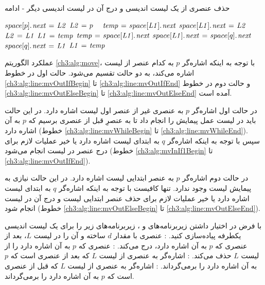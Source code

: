 \begin{algorithm}
\caption*{حذف عنصری از یک لیست اندیسی و درج آن در لیست اندیسی دیگر - ادامه}
\begin{latin}
\begin{algorithmic}[1]
						\State	$space[p].\hspace*{1pt}\mathit{next} \mathrel{\hspace{1pt}=\hspace{1pt}} \mathit{L2}$
						\State	$\mathit{L2} \mathrel{\hspace{1pt}=\hspace{1pt}} p$
				\EndIf\ \label{ch3:alg:line:mvOutIfEnd}
		\Else
				\label{ch3:alg:line:mvOutElseBegin}
						\State	$\mathit{temp} \mathrel{\hspace{1pt}=\hspace{1pt}} space[\mathit{L1}].\hspace*{1pt}\mathit{next}$
						\State	$space[\mathit{L1}].\hspace*{1pt}\mathit{next} \mathrel{\hspace{1pt}=\hspace{1pt}} \mathit{L2}$
						\State	$\mathit{L2} \mathrel{\hspace{1pt}=\hspace{1pt}} \mathit{L1}$
						\State	$\mathit{L1} \mathrel{\hspace{1pt}=\hspace{1pt}} \mathit{temp}$
				\Else
						\State	$\mathit{temp} \mathrel{\hspace{1pt}=\hspace{1pt}} space[\mathit{L1}].\hspace*{1pt}\mathit{next}$
						\State	$space[\mathit{L1}].\hspace*{1pt}\mathit{next} \mathrel{\hspace{1pt}=\hspace{1pt}} space[q].\hspace*{1pt}\mathit{next}$
						\State	$space[q].\hspace*{1pt}\mathit{next} \mathrel{\hspace{1pt}=\hspace{1pt}} \mathit{L1}$
						\State	$\mathit{L1} \mathrel{\hspace{1pt}=\hspace{1pt}} \mathit{temp}$
				\EndIf
		\EndIf\ \label{ch3:alg:line:mvOutElseEnd}
\EndProcedure			
\end{algorithmic}
\end{latin}
\end{algorithm}

عملکرد الگوریتم {\eqref{ch3:alg:move}}، با توجه به اینکه اشاره‌گر {$p$} به کدام عنصر از لیست {} اشاره می‌کند، به دو حالت تقسیم می‌شود. حالت اول در خطوط {\ref{ch3:alg:line:mvOutIfBegin}} تا {\ref{ch3:alg:line:mvOutIfEnd}} و حالت دوم در خطوط {\ref{ch3:alg:line:mvOutElseBegin}} تا {\ref{ch3:alg:line:mvOutElseEnd}} آمده است.

در حالت اول اشاره‌گر {$p$} به عنصری غیر از عنصر اول لیست {} اشاره دارد. در این حالت باید در لیست {} عمل پیمایش را انجام داد تا به عنصرِ قبل از عنصری برسیم که {$p$} به آن اشاره دارد (خطوط {\ref{ch3:alg:line:mvWhileBegin}} تا {\ref{ch3:alg:line:mvWhileEnd}}). سپس با توجه به اینکه اشاره‌گر {$q$} به ابتدای لیست {} اشاره دارد یا خیر عملیات لازم برای درج عنصر در لیست {} انجام می‌شود (خطوط {\ref{ch3:alg:mvInIf1Begin}} تا {\ref{ch3:alg:line:mvOutIfEnd}}).

در حالت دوم اشاره‌گر {$p$} به عنصر ابتدایی لیست {} اشاره دارد. در این حالت نیازی به پیمایش لیست {} وجود ندارد. تنها کافیست با توجه به اینکه اشاره‌گر {$q$} به ابتدای لیست {} اشاره دارد یا خیر عملیات لازم برای حذف عنصر ابتدایی لیست {} و درج آن در لیست {} انجام شود (خطوط {\ref{ch3:alg:line:mvOutElseBegin}} تا {\ref{ch3:alg:line:mvOutElseEnd}}).

 با فرض در اختیار داشتن زیربرنامه‌های {} و {}، زیربرنامه‌های زیر را برای یک لیست اندیسی یکطرفه پیاده‌سازی کنید.
: عنصری با مقدار {$d$} ساخته و آن را در لیست {$L$}، بعد از عنصری که {$p$} به آن اشاره دارد، درج می‌کند.
: عنصری که {$p$} به آن اشاره دارد را از لیست {$L$} حذف می‌کند.
: اشاره‌گر به عنصری از لیست {$L$} که بعد از عنصری است که {$p$} به آن اشاره دارد را برمی‌گرداند.
: اشاره‌گر به عنصری از لیست {$L$} که قبل از عنصری است که {$p$} به آن اشاره دارد را برمی‌گرداند.

